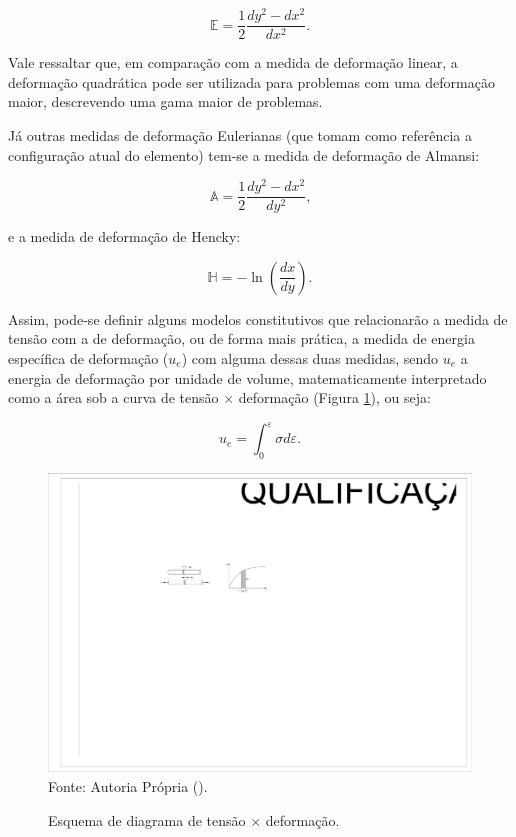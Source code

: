\documentclass[_ArquivoPrincipal.tex]{subfiles}
\begin{document}
\begin{equation}
    \mathbb{E}=\frac{1}{2}\frac{dy^2-dx^2}{dx^2}\text{.}
\end{equation}

\noindent Vale ressaltar que, em comparação com a medida de deformação linear, a deformação quadrática pode ser utilizada para problemas com uma deformação maior, descrevendo uma gama maior de problemas.

Já outras medidas de deformação Eulerianas (que tomam como referência a configuração atual do elemento) tem-se a medida de deformação de Almansi:

\begin{equation}
    \mathbb{A}=\frac{1}{2}\frac{dy^2-dx^2}{dy^2}\text{,}
\end{equation}

\noindent e a medida de deformação de Hencky:

\begin{equation}
    \mathbb{H}=-\ln{\left(\frac{dx}{dy}\right)}\text{.}
\end{equation}

Assim, pode-se definir alguns modelos constitutivos que relacionarão a medida de tensão com a de deformação, ou de forma mais prática, a medida de energia específica de deformação ($u_e$) com alguma dessas duas medidas, sendo $u_e$ a energia de deformação por unidade de volume, matematicamente interpretado como a área sob a curva de tensão $\times$ deformação (Figura \ref{fig:ue}), ou seja:

\begin{equation}
    u_e=\int_0^\varepsilon{\sigma d\varepsilon}\text{.}
\end{equation}

\begin{figure}[h]
    \centering
    \caption{Esquema de diagrama de tensão $\times$ deformação.}
    \includegraphics[width=.45\linewidth]{Figuras/ue.pdf}
    \\Fonte: Autoria Própria (\the\year).
    \label{fig:ue}
\end{figure}
\end{document}
